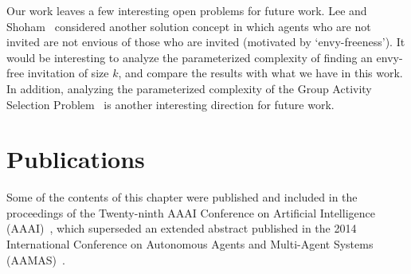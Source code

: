 Our work leaves a few interesting open problems for future work. 
Lee and Shoham~\cite{LEE15AAAI} considered another solution concept in which agents who are not invited are not envious of those who are invited (motivated by `envy-freeness'). It would be interesting to analyze the parameterized complexity of finding an envy-free invitation of size $k$, and compare the results with what we have in this work. In addition, analyzing the parameterized complexity of the Group Activity Selection Problem~\cite{GASP12WINE} is another interesting direction for future work. 


\section*{Publications}
Some of the contents of this chapter were published and included in the proceedings of the Twenty-ninth AAAI Conference on Artificial Intelligence  (AAAI)~\cite{LEE15AAAI}, which superseded an extended abstract published in the 2014 International Conference on Autonomous Agents and Multi-Agent Systems (AAMAS)~\cite{lee2014stable}.
